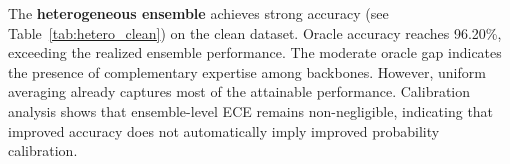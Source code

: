 
The \textbf{heterogeneous ensemble} achieves strong accuracy (see Table~\ref{tab:hetero_clean}) on the clean dataset.
Oracle accuracy reaches 96.20\%, exceeding the realized ensemble performance.
The moderate oracle gap indicates the presence of complementary expertise among backbones.
However, uniform averaging already captures most of the attainable performance.
Calibration analysis shows that ensemble-level ECE remains non-negligible, indicating that improved accuracy does not automatically imply improved probability calibration.